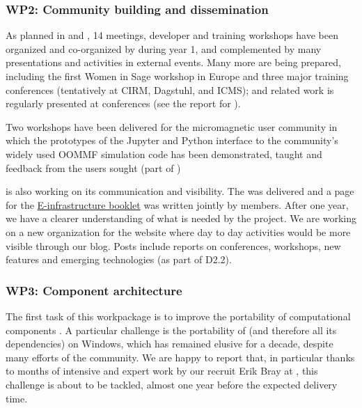 \documentclass{deliverablereport}
\begin{document}
\subsubsection{WP2: Community building and dissemination}

As planned in  and
, 14 meetings, developer and training
workshops have been organized and co-organized by \ODK during year 1,
and complemented by many presentations and activities in external events.
Many more are being prepared, including the first Women in Sage
workshop in Europe and three major training conferences (tentatively
at CIRM, Dagstuhl, and ICMS); \ODK and \ODK related work is regularly
presented at conferences (see the report for
).

Two workshops have been delivered for the micromagnetic user community
in which the prototypes of the Jupyter and Python interface to the
community's widely used OOMMF simulation code has been demonstrated,
taught and feedback from the users sought
(part of
)

\ODK is also working on its communication and visibility. The 
 was delivered and a page for the \href{https://github.com/OpenDreamKit/OpenDreamKit/blob/master/Communication/eInfra-Booklet/ODK.md}{E-infrastructure booklet} was written
jointly by \ODK members. After
one year, we have a clearer understanding of what is needed by the project.
We are working on a new organization for the website where day to day activities
would be more visible through our blog. Posts include reports on conferences, workshops,
new features and emerging technologies (as part of D2.2).


\subsubsection{WP3: Component architecture}

The first task of this workpackage is to improve the portability of
computational components
. A particular challenge
is the portability of \Sage (and therefore all its dependencies)
on Windows, which has remained elusive for a decade, despite many
efforts of the community. We are happy to report that, in particular
thanks to months of intensive and expert work by our recruit Erik Bray at 
, this challenge is about to be tackled, almost one year
before the expected delivery time.
\end{document}
